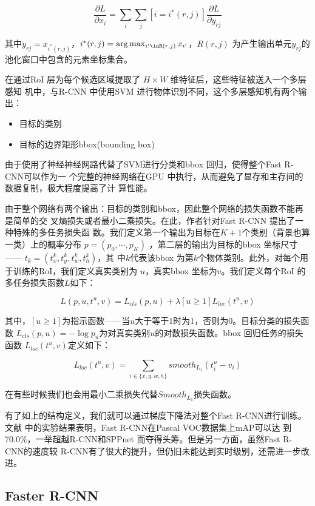 \[
\frac{\partial L}{\partial x_i} = \sum_{i}\sum_{j}[i = i^*(r,j)]\frac{\partial
  L}{\partial y_{rj}}
\]

其中$y_{rj} = x_{i^*(r,j)}$，$i^*(r,j) = \arg\max_{i'\inR(r,j)}x_{i'}$，$R(r,j)$
为产生输出单元$y_{rj}$的池化窗口中包含的元素坐标集合。

在通过RoI 层为每个候选区域提取了 $H \times W$ 维特征后，这些特征被送入一个多层感知
机中，与R-CNN 中使用SVM 进行物体识别不同，这个多层感知机有两个输出：

\begin{itemize}
  \item 目标的类别
  \item 目标的边界矩形bbox(bounding box)
\end{itemize}

由于使用了神经神经网路代替了SVM进行分类和bbox 回归，使得整个Fast R-CNN可以作为一
个完整的神经网络在GPU 中执行，从而避免了显存和主存间的数据复制，极大程度提高了计
算性能。

由于整个网络有两个输出：目标的类别和bbox，因此整个网络的损失函数不能再是简单的交
叉熵损失或者最小二乘损失。在此，作者针对Fast R-CNN 提出了一种特殊的多任务损失函
数。我们定义第一个输出为目标在$K+1$个类别（背景也算一类）上的概率分布 $p = (p_0,
\cdots, p_K)$ ，第二层的输出为目标的bbox 坐标尺寸 —— $t_k = (t_x^k, t_y^k, t_w^k, t_h^k)$，其
中$k$代表该bbox 为第$k$个物体类别。此外，对每个用于训练的RoI，我们定义真实类别为
$u$，真实bbox 坐标为$v$。我们定义每个RoI 的多任务损失函数$L$如下：

\[
L(p, u, t^u, v) = L_{cls}(p, u) + \lambda[u \geq 1]L_{loc}(t^u, v)
\]

其中，$[u \geq 1]$为指示函数——当$u$大于等于1时为1，否则为0。目标分类的损失函数
$L_{cls}(p,u) = -\log{p_u}$为对真实类别$u$的对数损失函数。bbox 回归任务的损失函数
$L_{loc}(t^u,v)$定义如下：

\[
L_{loc}(t^u, v) = \sum_{i\in \{x,y,w,h\}}{smooth_{L_1}(t_i^u-v_i)}
\]

在有些时候我们也会用最小二乘损失代替$Smooth_{L_1}$损失函数。

有了如上的结构定义，我们就可以通过梯度下降法对整个Fast R-CNN进行训练。文献
\cite{Girshick:2015ib}中的实验结果表明，Fast R-CNN在Pascal VOC数据集上mAP可以达
到70.0\%，一举超越R-CNN和SPPnet 而夺得头筹。但是另一方面，虽然Fast R-CNN的速度较
R-CNN有了很大的提升，但仍旧未能达到实时级别，还需进一步改进。

\subsection{Faster R-CNN}

